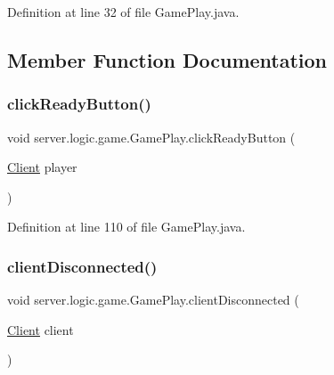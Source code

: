 Definition at line 32 of file Game\+Play.\+java.



\subsection{Member Function Documentation}
\hypertarget{classserver_1_1logic_1_1game_1_1_game_play_ae630a7fdd6c0f8fbf518ffa28e91d5fb}{}\label{classserver_1_1logic_1_1game_1_1_game_play_ae630a7fdd6c0f8fbf518ffa28e91d5fb} 
\subsubsection{\texorpdfstring{click\+Ready\+Button()}{clickReadyButton()}}
{\footnotesize\ttfamily void server.\+logic.\+game.\+Game\+Play.\+click\+Ready\+Button (\begin{DoxyParamCaption}\item[{\hyperlink{classserver_1_1conn_1_1_client}{Client}}]{player }\end{DoxyParamCaption})}



Definition at line 110 of file Game\+Play.\+java.

\hypertarget{classserver_1_1logic_1_1game_1_1_game_play_a45c1b20f210822845ab753b2fdc2dd89}{}\label{classserver_1_1logic_1_1game_1_1_game_play_a45c1b20f210822845ab753b2fdc2dd89} 
\subsubsection{\texorpdfstring{client\+Disconnected()}{clientDisconnected()}}
{\footnotesize\ttfamily void server.\+logic.\+game.\+Game\+Play.\+client\+Disconnected (\begin{DoxyParamCaption}\item[{\hyperlink{classserver_1_1conn_1_1_client}{Client}}]{client }\end{DoxyParamCaption})}



